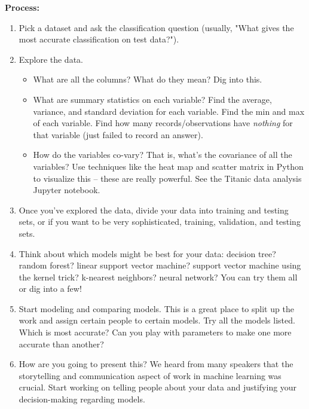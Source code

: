 \documentclass[10pt]{article}
\begin{document}
\textbf{Process:}
\begin{enumerate}
\item Pick a dataset and ask the classification question (usually, "What gives the most accurate classification on test data?"). 
\item Explore the data. 
\begin{itemize}
\item What are all the columns? What do they mean? Dig into this.
\item What are summary statistics on each variable? Find the average, variance, and standard deviation for each variable. Find the min and max of each variable. Find how many records/observations have \textit{nothing} for that variable (just failed to record an answer).
\item How do the variables co-vary? That is, what's the covariance of all the variables? Use techniques like the heat map and scatter matrix in Python to visualize this -- these are really powerful. See the Titanic data analysis Jupyter notebook.
\end{itemize}
\item Once you've explored the data, divide your data into training and testing sets, or if you want to be very sophisticated, training, validation, and testing sets.
\item Think about which models might be best for your data: decision tree? random forest? linear support vector machine? support vector machine using the kernel trick? k-nearest neighbors? neural network? You can try them all or dig into a few!
\item Start modeling and comparing models. This is a great place to split up the work and assign certain people to certain models. Try all the models listed. Which is most accurate? Can you play with parameters to make one more accurate than another?
\item How are you going to present this? We heard from many speakers that the storytelling and communication aspect of work in machine learning was crucial. Start working on telling people about your data and justifying your decision-making regarding models. 
\end{enumerate}
\end{document}
